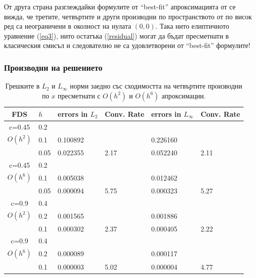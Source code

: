 \documentclass{article}
\newcommand{\rf}[1]{(\ref{#1})}
\theoremstyle{remark}
\begin{document}
От друга страна разглеждайки формулите от ``best-fit'' апроксимацията от \cite{Ch2011} се вижда, че третите, четвъртите и други производни по пространството от по висок ред са неограничени в околност на нулата $(0,0)$. Така нито елиптичното уравнение \rf{eq3}, нито остатъка \rf{residual} могат да бъдат пресметнати в класическия смисъл и следователно не са удовлетворени от ``best-fit'' формулите!

\subsubsection{Производни на решението}
\begin{center}
\begin{table}[ht]
\centering
		\begin{tabular}{||c|l|ll|ll||}
			\hline
			\hline
      FDS       & $h$ &errors in $L_2$&Conv. Rate& errors in $L_\infty$&Conv. Rate\\
   			\hline 
					\hline 
      c=0.45    	& 0.2  	&             		&             &                    &   \\
   $O(h^2)$     	& 0.1    	& 0.100892  	&             	& 0.226160 &   \\
                		& 0.05   & 0.022355  	& 2.17  		& 0.052240 &2.11 \\
               	 \hline 
      c=0.45    	& 0.2  	&             		&             &                    &   \\
   $O(h^6)$     	& 0.1    	& 0.005038  	&             &  0.012462 &   \\
                		& 0.05   & 0.000094  	& 5.75 	  &  0.000323 &5.27 \\
			\hline
			\hline 	
      c=0.9     	& 0.4  	&             		&             &                    &   \\
   $O(h^2)$     	& 0.2    	& 0.001565  	&             	&0.001886 &   \\
                		& 0.1    & 0.000302  	& 2.37  		&0.000405 &2.22 \\
               	 \hline 
      c=0.9     	& 0.4  	&             		&             &                    &   \\
   $O(h^6)$     	& 0.2    	& 0.000089  	&             & 0.000117 &   \\
                		& 0.1    & 0.000003  	& 5.02 	  & 0.000004  &4.77 \\
		   \hline
			\hline 
		\end{tabular}
		\caption{Грешките в $L_2$ и $L_\infty$ норми заедно със сходимостта на четвъртите производни по $x$ пресметнати с $O(h^2)$ и $O(h^6)$ апроксимации.}
\label{tab:fourth-der}
\end{table}
\end{center}
\end{document}

